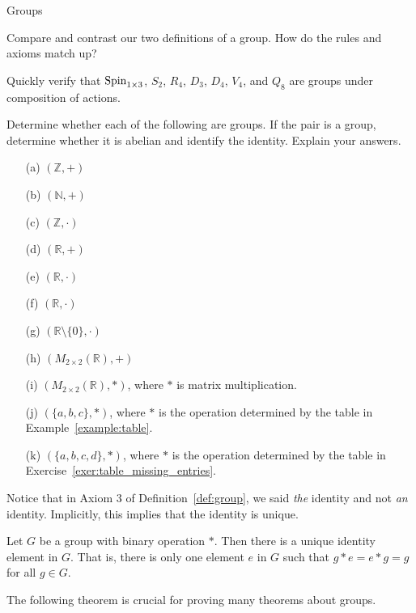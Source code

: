 \begin{section}{Groups}
\begin{exercise}
Compare and contrast our two definitions of a group.  How do the rules and axioms match up?
\end{exercise}

\begin{exercise}
Quickly verify that $\operatorname{Spin}_{1\times 3}$, $S_2$, $R_4$, $D_3$, $D_4$, $V_4$, and $Q_8$ are groups under composition of actions.
\end{exercise}

\begin{exercise}
Determine whether each of the following are groups.  If the pair is a group, determine whether it is abelian and identify the identity.  Explain your answers.
\begin{enumerate}
\item[(a)] $(\mathbb{Z},+)$
\item[(b)] $(\mathbb{N},+)$
\item[(c)] $(\mathbb{Z},\cdot)$
\item[(d)] $(\mathbb{R},+)$
\item[(e)] $(\mathbb{R},\cdot)$
\item[(f)] $(\mathbb{R},\cdot)$
\item[(g)] $(\mathbb{R}\setminus \{0\},\cdot)$
\item[(h)] $(M_{2\times 2}(\mathbb{R}),+)$
\item[(i)] $(M_{2\times 2}(\mathbb{R}),*)$, where $*$ is matrix multiplication.
\item[(j)] $(\{a,b,c\},*)$, where $*$ is the operation determined by the table in Example~\ref{example:table}.
\item[(k)] $(\{a,b,c,d\},*)$, where $*$ is the operation determined by the table in Exercise~\ref{exer:table_missing_entries}.
\end{enumerate}
\end{exercise}

Notice that in Axiom 3 of Definition~\ref{def:group}, we said \emph{the} identity and not \emph{an} identity.  Implicitly, this implies that the identity is unique.

\begin{theorem}
Let $G$ be a group with binary operation $*$.  Then there is a unique identity element in $G$.  That is, there is only one element $e$ in $G$ such that $g*e=e*g=g$ for all $g\in G$.
\end{theorem}

The following theorem is crucial for proving many theorems about groups.


\end{section}
